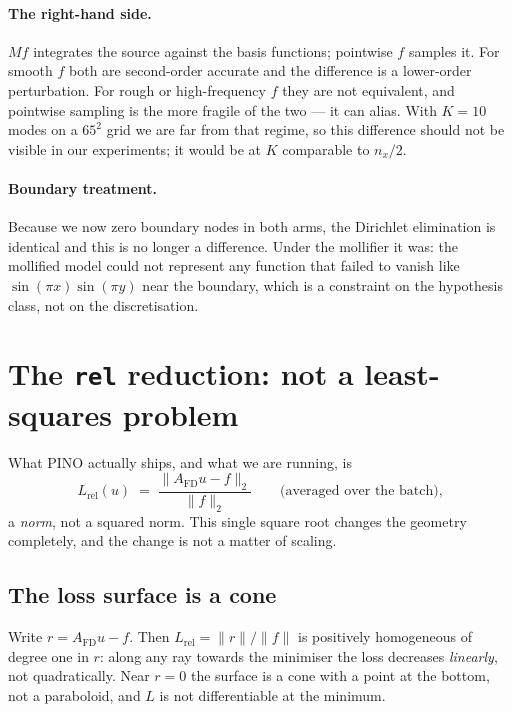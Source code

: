 \documentclass[11pt]{article}
\newcommand{\Afd}{A_{\mathrm{FD}}}
\begin{document}
\paragraph{The right-hand side.} $Mf$ integrates the source against the basis functions; pointwise
$f$ samples it. For smooth $f$ both are second-order accurate and the difference is a lower-order
perturbation. For rough or high-frequency $f$ they are not equivalent, and pointwise sampling is
the more fragile of the two --- it can alias. With $K=10$ modes on a $65^2$ grid we are far from
that regime, so this difference should not be visible in our experiments; it would be at $K$
comparable to $n_x/2$.

\paragraph{Boundary treatment.} Because we now zero boundary nodes in both arms, the Dirichlet
elimination is identical and this is no longer a difference. Under the mollifier it was: the
mollified model could not represent any function that failed to vanish like
$\sin(\pi x)\sin(\pi y)$ near the boundary, which is a constraint on the hypothesis class, not on
the discretisation.

\section{The \texttt{rel} reduction: not a least-squares problem}

What PINO actually ships, and what we are running, is
\begin{equation}
  L_{\mathrm{rel}}(u) \;=\; \frac{\bigl\| \Afd u - f \bigr\|_2}{\|f\|_2}
  \qquad\text{(averaged over the batch),}
\end{equation}
a \emph{norm}, not a squared norm. This single square root changes the geometry completely, and the
change is not a matter of scaling.

\subsection{The loss surface is a cone}

Write $r = \Afd u - f$. Then $L_{\mathrm{rel}} = \|r\|/\|f\|$ is positively homogeneous of degree
one in $r$: along any ray towards the minimiser the loss decreases \emph{linearly}, not
quadratically. Near $r=0$ the surface is a cone with a point at the bottom, not a paraboloid, and
$L$ is not differentiable at the minimum.
\end{document}
